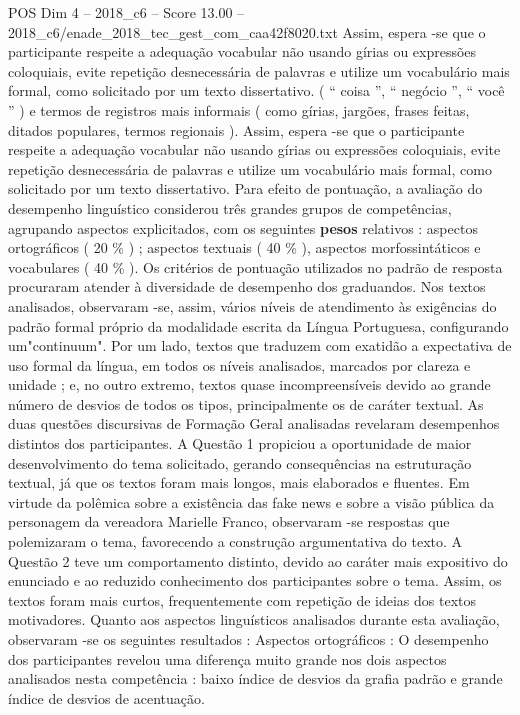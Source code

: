 \begin{textsample}{POS Dim 4 – 2018\_c6 – Score 13.00 – 2018\_c6/enade\_2018\_tec\_gest\_com\_caa42f8020.txt}
Assim, espera -se que o participante respeite a adequação vocabular não usando gírias ou expressões coloquiais, evite repetição desnecessária de palavras e utilize um vocabulário mais formal, como solicitado por um texto dissertativo. ( “ coisa ”, “ negócio ”, “ você ” ) e termos de registros mais informais ( como gírias, jargões, frases feitas, ditados populares, termos regionais ).
Assim, espera -se que o participante respeite a adequação vocabular não usando gírias ou expressões coloquiais, evite repetição desnecessária de palavras e utilize um vocabulário mais formal, como solicitado por um texto dissertativo.
Para efeito de pontuação, a avaliação do desempenho linguístico considerou três grandes grupos de competências, agrupando aspectos explicitados, com os seguintes \textbf{pesos} relativos : aspectos ortográficos ( 20 \% ) ; aspectos textuais ( 40 \% ), aspectos morfossintáticos e vocabulares ( 40 \% ).
Os critérios de pontuação utilizados no padrão de resposta procuraram atender à diversidade de desempenho dos graduandos.
Nos textos analisados, observaram -se, assim, vários níveis de atendimento às exigências do padrão formal próprio da modalidade escrita da Língua Portuguesa, configurando um"continuum".
Por um lado, textos que traduzem com exatidão a expectativa de uso formal da língua, em todos os níveis analisados, marcados por clareza e unidade ; e, no outro extremo, textos quase incompreensíveis devido ao grande número de desvios de todos os tipos, principalmente os de caráter textual.
As duas questões discursivas de Formação Geral analisadas revelaram desempenhos distintos dos participantes.
A Questão 1 propiciou a oportunidade de maior desenvolvimento do tema solicitado, gerando consequências na estruturação textual, já que os textos foram mais longos, mais elaborados e fluentes.
Em virtude da polêmica sobre a existência das fake news e sobre a visão pública da personagem da vereadora Marielle Franco, observaram -se respostas que polemizaram o tema, favorecendo a construção argumentativa do texto.
A Questão 2 teve um comportamento distinto, devido ao caráter mais expositivo do enunciado e ao reduzido conhecimento dos participantes sobre o tema.
Assim, os textos foram mais curtos, frequentemente com repetição de ideias dos textos motivadores.
Quanto aos aspectos linguísticos analisados durante esta avaliação, observaram -se os seguintes resultados : Aspectos ortográficos : O desempenho dos participantes revelou uma diferença muito grande nos dois aspectos analisados nesta competência : baixo índice de desvios da grafia padrão e grande índice de desvios de acentuação.

\end{textsample}
